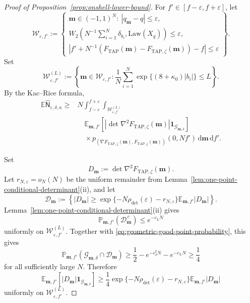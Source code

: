 \documentclass[a4paper,10pt,reqno]{amsart}
\numberwithin{equation}{section}
\newcommand{\ve}{\varepsilon}
\newcommand{\dP}{\mathbb{P}}%
\newcommand{\dE}{\mathbb{E}}%
\newcommand{\Law}{\mathrm{Law}}
\newcommand{\dd}{\mathrm{d}}
\newcommand{\TAP}{\mathrm{TAP}}
\newcommand{\bfm}{\mathbf{m}}
\begin{document}
\begin{proof}[Proof of Proposition~\ref{prop:onshell-lower-bound}]
		For \(f'\in[f-\ve,f+\ve]\), let
		\[
		\mathcal W_{\ve,f'}
		:=
		\left\{
		\begin{array}{l}
			\bfm\in(-1,1)^N:\ |q_\bfm-q|\le\ve,\\[1mm]
			W_2\left(N^{-1}\sum_{i=1}^N\delta_{b_i},\Law(X_q)\right)
			\le\ve,\\[1mm]
			\left|f'+N^{-1}\left(F_{\TAP}(\bfm)
			-F_{\TAP,\zeta}(\bfm)\right)-f\right|\le\ve
		\end{array}
		\right\}.
		\]
		Set
		\[
		\mathcal W_{\ve,f'}^{(L)}
		:=
		\left\{
		\bfm\in\mathcal W_{\ve,f'}:
		\frac1N\sum_{i=1}^N
		\exp\{(8+\kappa_0)|b_i|\}\le L
		\right\}.
		\]
		By the Kac--Rice formula,
		\[
		\begin{aligned}
			\dE\widehat{\mathsf N}_{\ve,\delta,\kappa}
			\ge{}&
			N\int_{f-\ve}^{f+\ve}
			\int_{\mathcal W_{\ve,f'}^{(L)}}\\
			&\quad\dE_{\bfm,f'}\!\left[
			\left|\det\nabla^2F_{\TAP,\zeta}(\bfm)\right|
			\boldsymbol 1_{\mathcal G_{\bfm,\delta}}
			\right]\\
			&\quad\times
			p_{\left(
				\nabla F_{\TAP,\zeta}(\bfm),
				F_{\TAP,\zeta}(\bfm)
				\right)}(0,Nf')
			\,\dd\bfm\,\dd f'.
		\end{aligned}
		\]
		
		Set
		\[
		D_\bfm
		:=
		\det\nabla^2F_{\TAP,\zeta}(\bfm).
		\]
		Let \(r_{N,\ve}=o_N(N)\) be the uniform remainder from
		Lemma~\ref{lem:one-point-conditional-determinant}\textup{(ii)}, and let
		\[
		\mathcal D_\bfm
		:=
		\left\{
		|D_\bfm|
		\ge
		\exp\{-N\rho_{\det}(\ve)-r_{N,\ve}\}
		\dE_{\bfm,f'}|D_\bfm|
		\right\}.
		\]
		Lemma~\ref{lem:one-point-conditional-determinant}\textup{(ii)} gives
		\[
		\dP_{\bfm,f'}(\mathcal D_\bfm^{\,c})
		\le e^{-c_LN}
		\]
		uniformly on \(\mathcal W_{\ve,f'}^{(L)}\). Together with
		\eqref{eq:geometric-good-point-probability}, this gives
		\[
		\dP_{\bfm,f'}\left(
		\mathcal G_{\bfm,\delta}\cap\mathcal D_\bfm
		\right)
		\ge
		\frac12-e^{-c_\delta^{\mathrm I}N}-e^{-c_LN}
		\ge\frac14
		\]
		for all sufficiently large \(N\). Therefore
		\begin{equation}\label{eq:geometric-local-stability-input}
			\dE_{\bfm,f'}\left[
			|D_\bfm|
			\boldsymbol 1_{\mathcal G_{\bfm,\delta}}
			\right]
			\ge
			\frac14
			\exp\{-N\rho_{\det}(\ve)-r_{N,\ve}\}
			\dE_{\bfm,f'}|D_\bfm|
		\end{equation}
		uniformly on \(\mathcal W_{\ve,f'}^{(L)}\).
		

\end{proof}
\end{document}
